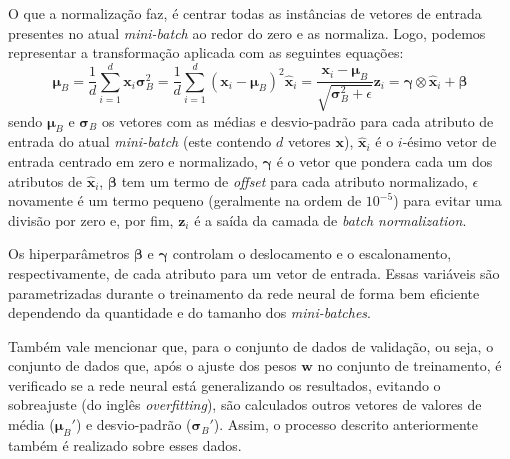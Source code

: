\documentclass[a4paper, 12pt]{article}
\begin{document}
O que a normalização faz, é centrar todas as instâncias de vetores de entrada presentes no atual \textit{mini-batch} ao redor do zero e as normaliza. Logo, podemos representar a transformação aplicada com as seguintes equações:
\begin{subequations}
\begin{equation}\label{eq:bn-1}
 \boldsymbol{\mu}_{B} = \frac{1}{d} \sum_{i=1}^{d} \mathbf{x}_{i} 
\end{equation}
\begin{equation}\label{eq:bn-2}
\boldsymbol{\sigma}_{B}^{2} = \frac{1}{d} \sum_{i=1}^{d} (\mathbf{x}_{i} - \boldsymbol{\mu}_{B})^2 
\end{equation}
\begin{equation}\label{eq:bn-3}
\hat{\mathbf{x}}_{i} = \frac{\mathbf{x}_{i} - \boldsymbol{\mu}_{B}}{\sqrt{\boldsymbol{\sigma}_{B}^2 + \epsilon}}
\end{equation}
\begin{equation}\label{eq:bn-4}
\mathbf{z}_{i} = \boldsymbol{\gamma} \otimes \hat{\mathbf{x}}_{i} + \boldsymbol{\beta}
\end{equation}
\end{subequations}
sendo $\boldsymbol{\mu}_{B}$ e $\boldsymbol{\sigma}_{B}$ os vetores com as médias e desvio-padrão para cada atributo de entrada do atual \textit{mini-batch} (este contendo $d$ vetores $\mathbf{x}$), $\hat{\mathbf{x}}_{i}$ é o $i$-ésimo vetor de entrada centrado em zero e normalizado, $\boldsymbol{\gamma}$ é o vetor que pondera cada um dos atributos de $\hat{\mathbf{x}}_{i}$, $\boldsymbol{\beta}$ tem um termo de \textit{offset} para cada atributo normalizado, $\epsilon$ novamente é um termo pequeno (geralmente na ordem de $10^{-5}$) para evitar uma divisão por zero e, por fim, $\mathbf{z}_{i}$ é a saída da camada de \textit{batch normalization}.

Os hiperparâmetros $\boldsymbol{\beta}$ e $\boldsymbol{\gamma}$ controlam o deslocamento e o escalonamento, respectivamente, de cada atributo para um vetor de entrada. Essas variáveis são parametrizadas durante o treinamento da rede neural de forma bem eficiente dependendo da quantidade e do tamanho dos \textit{mini-batches}. 

Também vale mencionar que, para o conjunto de dados de validação, ou seja, o conjunto de dados que, após o ajuste dos pesos $\mathbf{w}$ no conjunto de treinamento, é verificado se a rede neural está generalizando os resultados, evitando o sobreajuste (do inglês \textit{overfitting}), são calculados outros vetores de valores de média ($\boldsymbol{\mu}_{B}'$) e desvio-padrão ($\boldsymbol{\sigma}_{B}'$). Assim, o processo descrito anteriormente também é realizado sobre esses dados.
\end{document}
